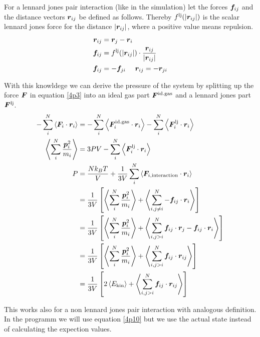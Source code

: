 For a lennard jones pair interaction (like in the simulation) let the forces $\boldsymbol{f}_{ij}$ and the distance vectors $\boldsymbol{r}_{ij}$ be defined as follows. 
Thereby $f^\text{lj}(\left| \boldsymbol{r}_{ij}\right|)$ is the scalar lennard jones force for the distance $\left| \boldsymbol{r}_{ij}\right|$, where a positive value means repulsion.
\begin{align}
\boldsymbol{r}_{ij}
	&=\boldsymbol{r}_{j} - \boldsymbol{r}_{i}
	\label{4rij}\\
\boldsymbol{f}_{ij} 
	&= f^\text{lj}(\left| \boldsymbol{r}_{ij}\right|)\cdot\frac{\boldsymbol{r}_{ij}}{\left| \boldsymbol{r}_{ij}\right|}
	\label{4fij}\\
\boldsymbol{f}_{ij}
	&=-\boldsymbol{f}_{ji} 
	\ \ \ \ \boldsymbol{r}_{ij}
	=-\boldsymbol{r}_{ji}
\end{align}

With this knowldege we can derive the pressure of the system by splitting up the force $\boldsymbol{F}$ in equation \eqref{4p3} into an ideal gas part $\boldsymbol{F}^\text{id.gas}$ and a lennard jones part $\boldsymbol{F}^\text{lj}$.
\begin{align}
-\sum_i^N\left\langle\boldsymbol{F}_i\cdot\boldsymbol{r}_i\right\rangle
	&=-\sum_i^N\left\langle\boldsymbol{F}_i^\text{id.gas}\cdot\boldsymbol{r}_i\right\rangle -\sum_i^N\left\langle\boldsymbol{F}_i^\text{lj}\cdot\boldsymbol{r}_i\right\rangle
	\label{4p4}\\
\left\langle\sum_i^N\frac{\boldsymbol{p}_i^2}{m_i}\right\rangle
	&=3PV - \sum_i^N\left\langle\boldsymbol{F}_i^\text{lj}\cdot\boldsymbol{r}_i\right\rangle
	\label{4p5}\\
P
	&=\frac{Nk_BT}{V} + \frac{1}{3V}\sum_i^N\left\langle\boldsymbol{F}_{i,\text{interaction}}\cdot\boldsymbol{r}_i\right\rangle
	\label{4p6}\\
	&=\frac{1}{3V}\left[\left\langle\sum_i^N\frac{\boldsymbol{p}_i^2}{m_i}\right\rangle + \left\langle\sum_{i,j\neq i}^N-\boldsymbol{f}_{ij}\cdot\boldsymbol{r}_i\right\rangle\right]
	\label{4p7}\\
	&=\frac{1}{3V}\left[\left\langle\sum_i^N\frac{\boldsymbol{p}_i^2}{m_i}\right\rangle + \left\langle\sum_{i,j>i}^N\boldsymbol{f}_{ij}\cdot\boldsymbol{r}_{j}-\boldsymbol{f}_{ij}\cdot\boldsymbol{r}_{i}\right\rangle\right]
	\label{4p8}\\
	&=\frac{1}{3V}\left[\left\langle\sum_i^N\frac{\boldsymbol{p}_i^2}{m_i}\right\rangle + \left\langle\sum_{i,j>i}^N\boldsymbol{f}_{ij}\cdot\boldsymbol{r}_{ij}\right\rangle\right]
	\label{4p9}\\
	&=\frac{1}{3V}\left[ 2\left\langle E_\text{kin}\right\rangle + \left\langle\sum_{i,j>i}^N\boldsymbol{f}_{ij}\cdot\boldsymbol{r}_{ij}\right\rangle\right]
	\label{4p10}
\end{align}

This works also for a non lennard jones pair interaction with analogous definition.
In the programm we will use equation \eqref{4p10} but we use the actual state instead of calculating the expection values.

